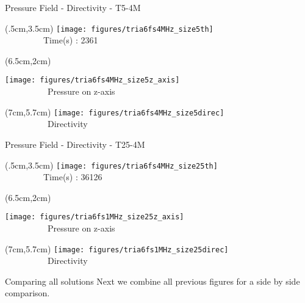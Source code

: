 \documentclass{beamer}
\begin{document}
\begin{frame}{Pressure Field - Directivity - T5-4M}
\begin{textblock*}{5cm}(.5cm,3.5cm) %
\texttt{[image: figures/tria6fs4MHz\_size5th]}
\newline \ \ \\ \ \ \ \ \ \ \ \ \ {\scriptsize Time(s) : 2361}
\end{textblock*}
\begin{textblock*}{5cm}(6.5cm,2cm) %

	\texttt{[image: figures/tria6fs4MHz\_size5z\_axis]}
	\\\ \ \ \ \ \ \ \ \ \ {\scriptsize Pressure on z-axis}
\end{textblock*}
\begin{textblock*}{5cm}(7cm,5.7cm) %
	\texttt{[image: figures/tria6fs4MHz\_size5direc]}
		\\\ \ \ \ \ \ \ \ \ \ {\scriptsize Directivity}
\end{textblock*}
\end{frame}

\begin{frame}{Pressure Field - Directivity - T25-4M}
\begin{textblock*}{5cm}(.5cm,3.5cm) %
\texttt{[image: figures/tria6fs4MHz\_size25th]}
\newline \ \ \\ \ \ \ \ \ \ \ \ \ {\scriptsize Time(s) : 36126}
\end{textblock*}
\begin{textblock*}{5cm}(6.5cm,2cm) %

	\texttt{[image: figures/tria6fs1MHz\_size25z\_axis]}
	\\\ \ \ \ \ \ \ \ \ \ {\scriptsize Pressure on z-axis}
\end{textblock*}
\begin{textblock*}{5cm}(7cm,5.7cm) %
	\texttt{[image: figures/tria6fs1MHz\_size25direc]}
		\\\ \ \ \ \ \ \ \ \ \ {\scriptsize Directivity}
\end{textblock*}
\end{frame}

\begin{frame}{Comparing all solutions}
Next we combine all previous figures for a side by side comparison.
\end{frame}
\end{document}
